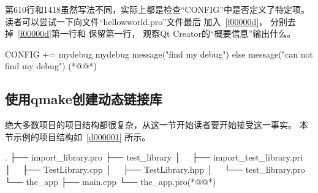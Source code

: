 第6\raisebox{0.16ex}{\sourcefonttwo\~{}}10行和14\raisebox{0.16ex}{\sourcefonttwo\~{}}18虽然写法不同，实际上都是检查“CONFIG”中是否定义了特定项。
读者可以尝试一下向文件“hellow\underline{\hspace{0.5em}}world.pro”文件最后
加入\filesourcenumbernameone\ \ref{f00000d}，
分别去掉\filesourcenumbernameone\ \ref{f00000d}第一行和
保留第一行，
观察Qt Creator的“概要信息”输出什么。
\label{f00000d}    %
\FloatBarrier                                  %
\begin{thebookfilesourceone}[escapeinside={(*@}{@*)},
caption=GoodLuck,
title=\filesourcenumbernameone \thefilesourcenumber
]
CONFIG += mydebug
mydebug{
    message("find my debug")
}else{
    message("can not find my debug")
}(*@\marginpar[\hfill\setlength\fboxsep{2pt}\fbox{\footnotesize{\kaishu\parbox{1em}{\setlength{\baselineskip}{2pt}\filesourcenumbernameone}}\footnotesize{\thefilesourcenumber}}]{\setlength\fboxsep{2pt}\fbox{\footnotesize{\kaishu\parbox{1em}{\setlength{\baselineskip}{2pt}\filesourcenumbernameone}}\footnotesize{\thefilesourcenumber}}}@*)\end{thebookfilesourceone}          %
\addtocounter{lstlisting}{-1}   %




%
% 
\FloatBarrier
\subsection{
使用qmake创建动态链接库
}\label{ss000710}


绝大多数项目的项目结构都很复杂，从这一节开始读者要开始接受这一事实。
本节示例的项目结构如\treeindexnumbernameone\ \ref{d000001}
所示。

{}\label{d000001}    %
\begin{thebookfilesourceonepathtree}[escapeinside={(*@}{@*)},
caption=GoodLuck,
numbers=none,
title=\treeindexnumbernameone \thetreeindexnumber
]
.
├── import_library.pro
├── test_library
│   ├── import_test_library.pri
│   ├── TestLibrary.cpp
│   ├── TestLibrary.hpp
│   └── test_library.pro
└── the_app
    ├── main.cpp
    └── the_app.pro(*@\marginpar[\hfill\setlength\fboxsep{2pt}\fbox{\footnotesize{\kaishu\parbox{1em}{\setlength{\baselineskip}{2pt}\treeindexnumbernameone}}\footnotesize{\thetreeindexnumber}}]{\setlength\fboxsep{2pt}\fbox{\footnotesize{\kaishu\parbox{1em}{\setlength{\baselineskip}{2pt}\treeindexnumbernameone}}\footnotesize{\thetreeindexnumber}}}@*)\end{thebookfilesourceonepathtree}          %
\addtocounter{lstlisting}{-1}   %


